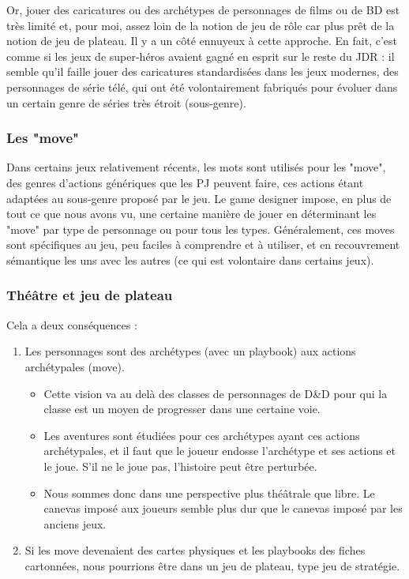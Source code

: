 \documentclass[a4paper, 11pt, twoside]{article}
\begin{document}
Or, jouer des caricatures ou des archétypes de personnages de films ou de BD est très limité et, pour moi, assez loin de la notion de jeu de rôle car plus prêt de la notion de jeu de plateau. Il y a un côté ennuyeux à cette approche. En fait, c'est comme si les jeux de super-héros avaient gagné en esprit sur le reste du JDR : il semble qu'il faille jouer des caricatures standardisées dans les jeux modernes, des personnages de série télé, qui ont été volontairement fabriqués pour évoluer dans un certain genre de séries très étroit (sous-genre).

\subsubsection{Les "move"}
\label{sec:orgfc0721b}

Dans certains jeux relativement récents, les mots sont utilisés pour les "move", des genres d'actions génériques que les PJ peuvent faire, ces actions étant adaptées au sous-genre proposé par le jeu. Le game designer impose, en plus de tout ce que nous avons vu, une certaine manière de jouer en déterminant les "move" par type de personnage ou pour tous les types. Généralement, ces moves sont spécifiques au jeu, peu faciles à comprendre et à utiliser, et en recouvrement sémantique les uns avec les autres (ce qui est volontaire dans certains jeux).

\subsubsection{Théâtre et jeu de plateau}
\label{sec:org29ca016}

Cela a deux conséquences :
\begin{enumerate}
\item Les personnages sont des archétypes (avec un playbook) aux actions archétypales (move).
\begin{itemize}
\item Cette vision va au delà des classes de personnages de D\&D pour qui la classe est un moyen de progresser dans une certaine voie.
\item Les aventures sont étudiées pour ces archétypes ayant ces actions archétypales, et il faut que le joueur endosse l'archétype et ses actions et le joue. S'il ne le joue pas, l'histoire peut être perturbée.
\item Nous sommes donc dans une perspective plus théâtrale que libre. Le canevas imposé aux joueurs semble plus dur que le canevas imposé par les anciens jeux.
\end{itemize}
\item Si les move devenaient des cartes physiques et les playbooks des fiches cartonnées, nous pourrions être dans un jeu de plateau, type jeu de stratégie.
\end{enumerate}
\end{document}
